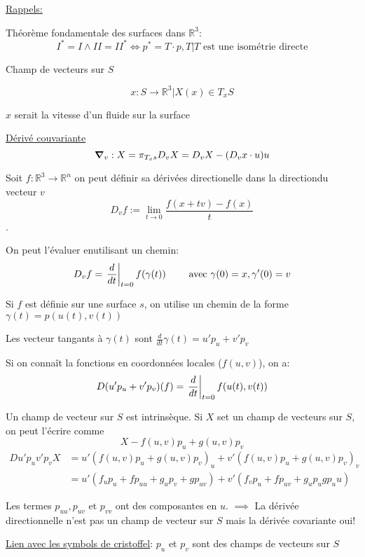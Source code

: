



\underline{Rappels:}

Théorème fondamentale des surfaces dans $\mathbb{R}^{3}$:
$$I^* = I \wedge II = II^* \iff p^*=T\cdot p, T|T \text{ est une isométrie directe}$$ 

Champ de vecteurs sur $S$

$$x:S \to \mathbb{R}^{3} | X(x) \in T_{x}S$$ 

$x$ serait la vitesse d'un fluide sur la surface 

\underline{Dérivé couvariante} $$\grad_{v}: X = \pi_{T_{x} s} D_{v} X = D_{v} X -(D_{v} x \cdot u) u$$ 


\begin{tcolorbox}[title=Rappels sur les dérivées directionnelles]
	Soit $f: \mathbb{R}^{3} \to \mathbb{R}^{n} $ on peut définir sa dérivées directionelle dans la directiondu vecteur $v$ $$D_{v} f:= \lim_{t\to0} \frac{f(x+tv)-f(x)}{t}  $$. 

On peut l'évaluer enutilisant un chemin: $$D_{v} f = \eval{\frac{d}{dt}}_{t=0} f(\gamma(t)) \qquad \text{ avec } \gamma(0)=x, \gamma'(0)=v$$ 

Si $f$ est définie sur une surface $s$, on utilise un chemin de la forme $\gamma(t)=p(u(t),v(t))$   

Les vecteur tangants à $\gamma(t)$ sont $\frac{d}{dt} \gamma(t) = u'p_{u} + v'p_{v} $ 

Si on connaît la fonctions en coordonnées locales ($f(u,v)$), on a: $$D(u'p_{u} + v' p_{v})(f) = \eval{\frac{d}{dt} }_{t=0} f(u(t), v(t))$$ 

\end{tcolorbox}

Un champ de vecteur sur $S$ est intrinsèque. Si $X$ set un champ de vecteurs sur $S$, on peut l'écrire comme $$X - f(u,v)p_{u} + g(u,v)p_{v} $$  
$$\begin{aligned}
	Du'p_{u} v' p_{v} X &= u'(f(u,v)p_{u} + g(u,v)p_{v} )_u + v'(f(u,v) p_{u} +g(u,v)p_{v} )_v\\
			&= u'(f_{u} p_{u} + fp_{uu} +g_{u} p_{v} +g p_{uv}) +v'(f_{v} p_{u} + f p_{uv} + g_{u} p_{u} g p_uu)
\end{aligned}$$ 

Les termes $p_{uu}, p_{uv} \text{ et } p_{vv}$ ont des composantes en $u$. $\implies$ La dérivée directionnelle n'est pas un champ de vecteur sur $S$ mais la dérivée covariante oui!


\underline{Lien avec les symbols de cristoffel}: $p_{u}$ et $p_{v}$ sont des champs de vecteurs sur $S$

